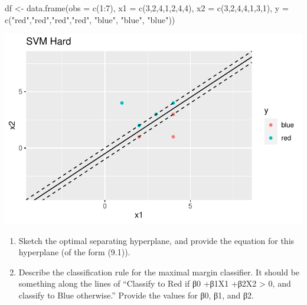 \documentclass[
  letterpaper,
  DIV=11,
  numbers=noendperiod]{scrartcl}
\newenvironment{Shaded}{\begin{snugshade}}{\end{snugshade}}
\newcommand{\AttributeTok}[1]{\textcolor[rgb]{0.40,0.45,0.13}{#1}}
\newcommand{\DecValTok}[1]{\textcolor[rgb]{0.68,0.00,0.00}{#1}}
\newcommand{\FunctionTok}[1]{\textcolor[rgb]{0.28,0.35,0.67}{#1}}
\newcommand{\NormalTok}[1]{\textcolor[rgb]{0.00,0.23,0.31}{#1}}
\newcommand{\OtherTok}[1]{\textcolor[rgb]{0.00,0.23,0.31}{#1}}
\newcommand{\SpecialCharTok}[1]{\textcolor[rgb]{0.37,0.37,0.37}{#1}}
\newcommand{\StringTok}[1]{\textcolor[rgb]{0.13,0.47,0.30}{#1}}
\begin{document}
\begin{Shaded}
\begin{Highlighting}[]
\NormalTok{df }\OtherTok{\textless{}{-}} \FunctionTok{data.frame}\NormalTok{(}\AttributeTok{obs =} \FunctionTok{c}\NormalTok{(}\DecValTok{1}\SpecialCharTok{:}\DecValTok{7}\NormalTok{),}
                 \AttributeTok{x1 =} \FunctionTok{c}\NormalTok{(}\DecValTok{3}\NormalTok{,}\DecValTok{2}\NormalTok{,}\DecValTok{4}\NormalTok{,}\DecValTok{1}\NormalTok{,}\DecValTok{2}\NormalTok{,}\DecValTok{4}\NormalTok{,}\DecValTok{4}\NormalTok{),}
                 \AttributeTok{x2 =} \FunctionTok{c}\NormalTok{(}\DecValTok{3}\NormalTok{,}\DecValTok{2}\NormalTok{,}\DecValTok{4}\NormalTok{,}\DecValTok{4}\NormalTok{,}\DecValTok{1}\NormalTok{,}\DecValTok{3}\NormalTok{,}\DecValTok{1}\NormalTok{),}
                 \AttributeTok{y =} \FunctionTok{c}\NormalTok{(}\StringTok{"red"}\NormalTok{,}\StringTok{"red"}\NormalTok{,}\StringTok{"red"}\NormalTok{,}\StringTok{"red"}\NormalTok{, }\StringTok{"blue"}\NormalTok{, }\StringTok{"blue"}\NormalTok{, }\StringTok{"blue"}\NormalTok{))}
\end{Highlighting}
\end{Shaded}

\includegraphics{excercise_doc_files/figure-pdf/unnamed-chunk-24-1.pdf}

\begin{enumerate}
\def\labelenumi{(\alph{enumi})}
\setcounter{enumi}{1}
\item
  Sketch the optimal separating hyperplane, and provide the equation for
  this hyperplane (of the form (9.1)).
\item
  Describe the classification rule for the maximal margin classifier. It
  should be something along the lines of ``Classify to Red if β0 +β1X1
  +β2X2 \textgreater{} 0, and classify to Blue otherwise.'' Provide the
  values for β0, β1, and β2.
\end{enumerate}
\end{document}
